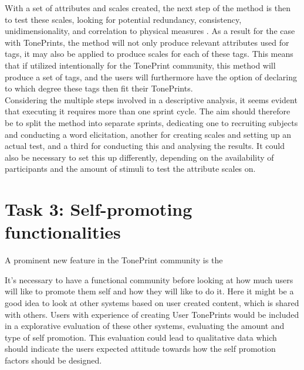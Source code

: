 With a set of attributes and scales created, the next step of the method is then to test these scales, looking for potential redundancy, consistency, unidimensionality, and correlation to physical measures \parencite[][10]{PDF:DescriptiveAnalysis}. As a result for the case with TonePrints, the method will not only produce relevant attributes used for tags, it may also be applied to produce scales for each of these tags. This means that if utilized intentionally for the TonePrint community, this method will produce a set of tags, and the users will furthermore have the option of declaring to which degree these tags then fit their TonePrints.\\

\noindent
Considering the multiple steps involved in a descriptive analysis, it seems evident that executing it requires more than one sprint cycle. The aim should therefore be to split the method into separate sprints, dedicating one to recruiting subjects and conducting a word elicitation, another for creating scales and setting up an actual test, and a third for conducting this and analysing the results. It could also be necessary to set this up differently, depending on the availability of participants and the amount of stimuli to test the attribute scales on.

%

\section{Task 3: Self-promoting functionalities}
\label{Task3}
A prominent new feature in the TonePrint community is the 

It's necessary to have a functional community before looking at how much users will like to promote them self and how they will like to do it. Here it might be a good idea to look at other systems based on user created content, which is shared with others. Users with experience of creating User TonePrints would be included in a explorative evaluation of these other systems, evaluating the amount and type of self promotion. This evaluation could lead to qualitative data which should indicate the users expected attitude towards how the self promotion factors should be designed.\\

